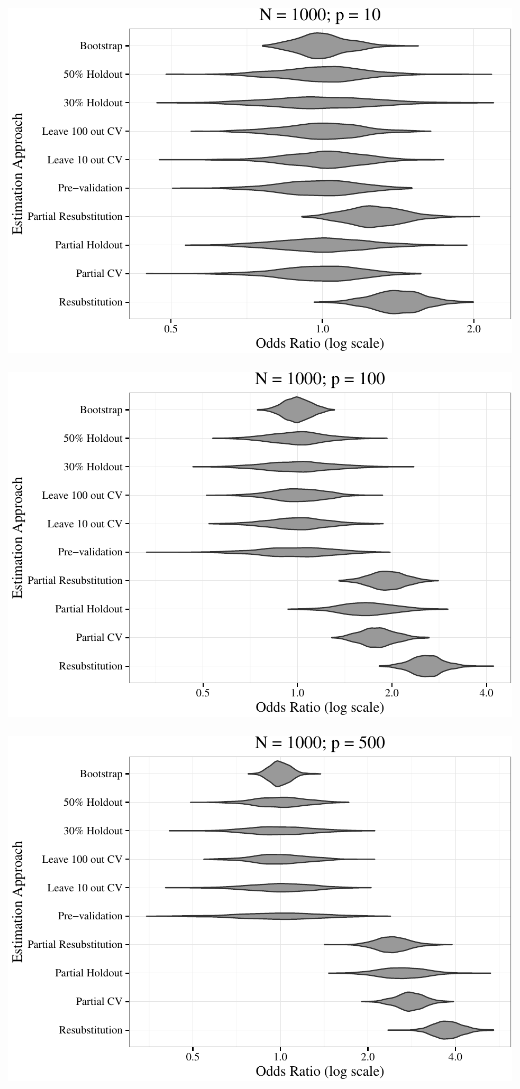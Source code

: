 \documentclass[11pt,]{article}
\begin{document}
\includegraphics{supplement_files/figure-latex/plots2-1.pdf} \clearpage

\includegraphics{supplement_files/figure-latex/plots2-2.pdf} \clearpage

\includegraphics{supplement_files/figure-latex/plots2-3.pdf} \clearpage
\end{document}
